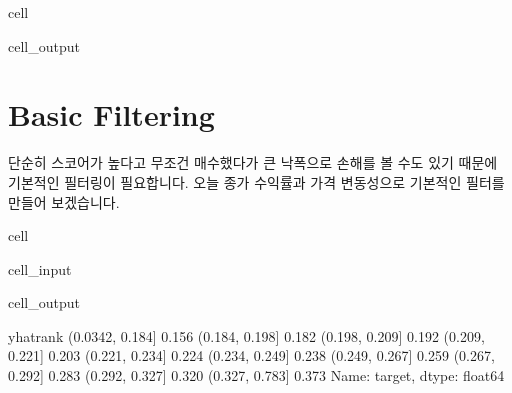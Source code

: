 \documentclass[letterpaper,10pt,english]{jupyterBook}
\begin{document}
\begin{sphinxuseclass}{cell}
\begin{sphinxVerbatimOutput}
\begin{sphinxuseclass}{cell_output}
\noindent{}

\end{sphinxuseclass}\end{sphinxVerbatimOutput}

\end{sphinxuseclass}

\part{Basic Filtering}
\label{\detokenize{chapter5/5.2.3_GAM:basic-filtering}}
\sphinxAtStartPar
단순히 스코어가 높다고 무조건 매수했다가 큰 낙폭으로 손해를 볼 수도 있기 때문에 기본적인 필터링이 필요합니다. 오늘 종가 수익률과 가격 변동성으로 기본적인 필터를 만들어 보겠습니다.

\begin{sphinxuseclass}{cell}\begin{sphinxVerbatimInput}

\begin{sphinxuseclass}{cell_input}
\begin{sphinxVerbatim}[commandchars=\\\{\}]
\PYG{p}{[}\PYG{p}{]}  
\PYG{p}{[}\PYG{p}{]}  \PYG{p}{[}\PYG{p}{]} 
\PYG{p}{[}\PYG{p}{]}
\end{sphinxVerbatim}

\end{sphinxuseclass}\end{sphinxVerbatimInput}
\begin{sphinxVerbatimOutput}

\begin{sphinxuseclass}{cell_output}
\begin{sphinxVerbatim}[commandchars=\\\{\}]
yhat\PYGZus{}rank
(0.0342, 0.184]   0.156
(0.184, 0.198]    0.182
(0.198, 0.209]    0.192
(0.209, 0.221]    0.203
(0.221, 0.234]    0.224
(0.234, 0.249]    0.238
(0.249, 0.267]    0.259
(0.267, 0.292]    0.283
(0.292, 0.327]    0.320
(0.327, 0.783]    0.373
Name: target, dtype: float64
\end{sphinxVerbatim}

\end{sphinxuseclass}\end{sphinxVerbatimOutput}

\end{sphinxuseclass}
\end{document}
